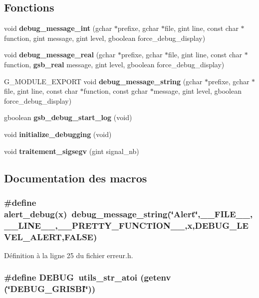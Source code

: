 \subsection*{Fonctions}
\begin{DoxyCompactItemize}
\item 
void {\bf debug\_\-message\_\-int} (gchar $\ast$prefixe, gchar $\ast$file, gint line, const char $\ast$function, gint message, gint level, gboolean force\_\-debug\_\-display)
\item 
void {\bf debug\_\-message\_\-real} (gchar $\ast$prefixe, gchar $\ast$file, gint line, const char $\ast$function, {\bf gsb\_\-real} message, gint level, gboolean force\_\-debug\_\-display)
\item 
G\_\-MODULE\_\-EXPORT void {\bf debug\_\-message\_\-string} (gchar $\ast$prefixe, gchar $\ast$file, gint line, const char $\ast$function, const gchar $\ast$message, gint level, gboolean force\_\-debug\_\-display)
\item 
gboolean {\bf gsb\_\-debug\_\-start\_\-log} (void)
\item 
void {\bf initialize\_\-debugging} (void)
\item 
void {\bf traitement\_\-sigsegv} (gint signal\_\-nb)
\end{DoxyCompactItemize}


\subsection{Documentation des macros}
\subsubsection[{alert\_\-debug}]{\setlength{\rightskip}{0pt plus 5cm}\#define alert\_\-debug(x)~debug\_\-message\_\-string(\char`\"{}Alert\char`\"{},\_\-\_\-FILE\_\-\_\-,\_\-\_\-LINE\_\-\_\-,\_\-\_\-PRETTY\_\-FUNCTION\_\-\_\-,x,DEBUG\_\-LEVEL\_\-ALERT,FALSE)}\label{erreur_8h_a89605ef34ba8b746a61b0614aa552b80}


Définition à la ligne 25 du fichier erreur.h.

\subsubsection[{DEBUG}]{\setlength{\rightskip}{0pt plus 5cm}\#define DEBUG~utils\_\-str\_\-atoi (getenv (\char`\"{}DEBUG\_\-GRISBI\char`\"{}))}\label{erreur_8h_ad72dbcf6d0153db1b8d8a58001feed83}


